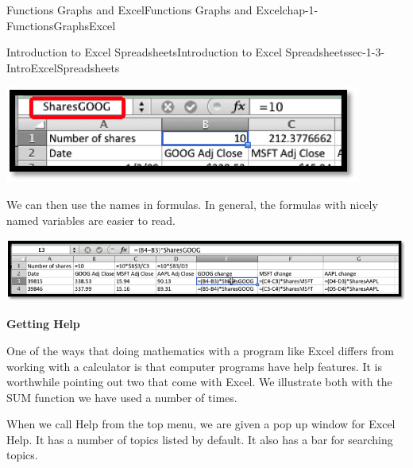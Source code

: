 \documentclass[oneside,10pt,]{book}
\newcommand{\terminology}[1]{\textbf{#1}}
\numberwithin{equation}{section}
\begin{document}
\begin{chapterptx}{Functions Graphs and Excel}{}{Functions Graphs and Excel}{}{}{chap-1-FunctionsGraphsExcel}
\begin{sectionptx}{Introduction to Excel Spreadsheets}{}{Introduction to Excel Spreadsheets}{}{}{sec-1-3-IntroExcelSpreadsheets}
\begin{sidebyside}{1}{0.3}{0.3}{0}%
\begin{sbspanel}{0.4}%
\includegraphics[width=1\linewidth]{images/sec1-3-14.png}
\end{sbspanel}%
\end{sidebyside}%
\par
\hypertarget{p-264}{}%
We can then use the names in formulas.  In general, the formulas with nicely named variables are easier to read.%
\begin{sidebyside}{1}{0.1}{0.1}{0}%
\begin{sbspanel}{0.8}%
\includegraphics[width=1\linewidth]{images/sec1-3-15.png}
\end{sbspanel}%
\end{sidebyside}%
\par
\hypertarget{p-265}{}%
\terminology{Getting Help}%
\par
\hypertarget{p-266}{}%
One of the ways that doing mathematics with a program like Excel differs from working with a calculator is that computer programs have help features.  It is worthwhile pointing out two that come with Excel.  We illustrate both with the SUM function we have used a number of times.%
\par
\hypertarget{p-267}{}%
When we call Help from the top menu, we are given a pop up window for Excel Help.  It has a number of topics listed by default.  It also has a bar for searching topics.%
\begin{sidebyside}{1}{0.1}{0.1}{0}%
\begin{sbspanel}{0.8}%

\end{sbspanel}
\end{sidebyside}
\end{sectionptx}
\end{chapterptx}
\end{document}
